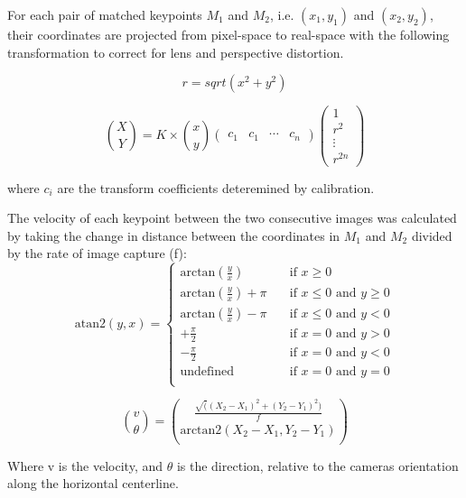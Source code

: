 For each pair of matched keypoints $M_{1}$ and $M_{2}$,
i.e. $(x_{1},y_{1})$ and $(x_{2},y_{2})$, their coordinates are
projected from pixel-space to real-space with the following
transformation to correct for lens and perspective distortion.

\begin{equation}
r = sqrt(x^2 + y^2)
\label{eq:hypothenus}
\end{equation}

\begin{equation}
\binom{X}{Y} = K \times \binom{x}{y}
\begin{pmatrix}
  c_{1} & c_{1} & \cdots & c_{n}
\end{pmatrix}
\begin{pmatrix}
  1 \\
  r^2 \\
  \vdots \\
  r^{2n}
\end{pmatrix}
\label{eq:undistort}
\end{equation}
\begin{flushleft}
where $c_{i}$ are the transform coefficients deteremined by calibration.
\end{flushleft}

The velocity of each keypoint between the two consecutive images was
calculated by taking the change in distance between the coordinates in $M_{1}$ and
$M_{2}$ divided by the rate of image capture (f):
\begin{equation}
  \text{atan2}(y,x) = 
  \begin{cases}
    \text{arctan}(\frac{y}{x})  & \quad \text{if } x \ge 0  \\
    \text{arctan}(\frac{y}{x}) + \pi  & \quad \text{if } x \le 0
    \text{ and } y \ge 0 \\
    \text{arctan}(\frac{y}{x}) - \pi  & \quad \text{if } x \le 0
    \text{ and } y < 0  \\
    +\frac{\pi}{2}  & \quad \text{if } x = 0
    \text{ and } y > 0  \\
    -\frac{\pi}{2}  & \quad \text{if } x = 0
    \text{ and } y < 0 \\
    \text{undefined}  & \quad \text{if } x = 0
    \text{ and } y = 0  \\
  \end{cases}
\label{eq:atan2}
\end{equation}

\begin{equation}
\binom{v}{\theta} = \binom{\frac{\sqrt((X_{2} - X_{1})^2 + (Y_{2} - Y_{1})^2)}{f}}{\text{arctan2}(X_{2} - X_{1}, Y_{2} - Y_{1})}
\label{eq:pts2vector}
\end{equation}
\begin{flushleft}
Where v is the velocity, and $\theta$ is the direction, relative to
the cameras orientation along the horizontal centerline.
\end{flushleft}

